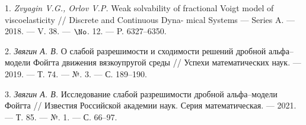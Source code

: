 

1. {\it Zvyagin V.G., Orlov V.P.} Weak solvability of fractional Voigt model of viscoelasticity // Discrete and Continuous Dyna- mical Systems --- Series A. --- 2018. --- V. 38. --- $\No$. 12. --- P. 6327--6350.

2. {\it Звягин А. В.} О слабой разрешимости и сходимости решений дробной альфа--модели Фойгта движения вязкоупругой среды // Успехи математических наук. --- 2019. --- Т. 74. --- №. 3. --- С. 189--190.

3. {\it Звягин А. В.} Исследование слабой разрешимости дробной альфа--модели Фойгта // Известия Российской академии наук. Серия математическая. --- 2021. --- Т. 85. --- №. 1. --- С. 66--97.

